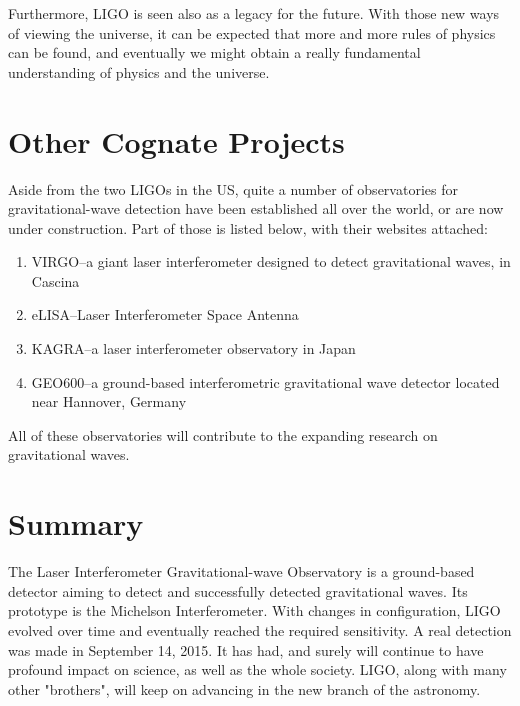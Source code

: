 \documentclass[aps,prl,preprint]{revtex4}
\begin{document}
Furthermore, LIGO is seen also as a legacy for the future. With those new ways of viewing the universe, it can be expected that more and more rules of physics can be found, and eventually we might obtain a really fundamental understanding of physics and the universe. \cite{Impact}



\section{Other Cognate Projects \label{other proj.}}
Aside from the two LIGOs in the US, quite a number of observatories for gravitational-wave detection have been established all over the world, or are now under construction. Part of those is listed below, with their websites attached:
	\begin{enumerate}
	\item VIRGO--a giant laser interferometer designed to detect gravitational waves, in Cascina \cite{Virgo}
	\item eLISA--Laser Interferometer Space Antenna  \cite{eLISA}
	\item KAGRA--a laser interferometer observatory in Japan \cite{KAGRA}
	\item GEO600--a ground-based interferometric gravitational wave detector located near Hannover, Germany \cite{GEO600}
	\end{enumerate}

All of these observatories will contribute to the expanding research on gravitational waves.

\section{Summary}
The Laser Interferometer Gravitational-wave Observatory is a ground-based detector aiming to detect and successfully detected gravitational waves. Its prototype is the Michelson Interferometer. With changes in configuration, LIGO evolved over time and eventually reached the required sensitivity. A real detection was made in September 14, 2015. It has had, and surely will continue to have profound impact on science, as well as the whole society. LIGO, along with many other "brothers", will keep on advancing in the new branch of the astronomy.



\end{document}
